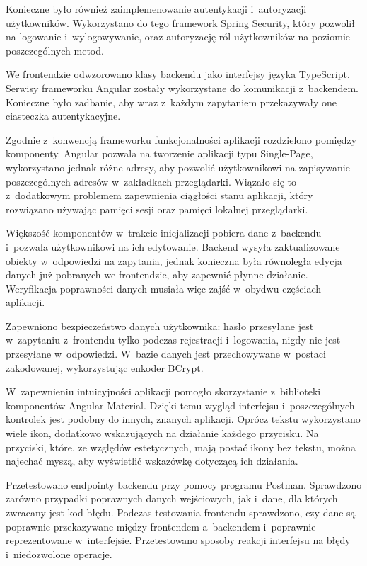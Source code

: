 \documentclass[a4paper,twoside,12pt]{book}
\begin{document}
Konieczne było również zaimplemenowanie autentykacji i~autoryzacji użytkowników. Wykorzystano do tego framework Spring Security, który pozwolił na logowanie i~wylogowywanie, oraz autoryzację ról użytkowników na poziomie poszczególnych metod.

We frontendzie odwzorowano klasy backendu jako interfejsy języka TypeScript. Serwisy frameworku Angular zostały wykorzystane do komunikacji z~backendem. Konieczne było zadbanie, aby wraz z~każdym zapytaniem przekazywały one ciasteczka autentykacyjne.

Zgodnie z~konwencją frameworku funkcjonalności aplikacji rozdzielono pomiędzy komponenty. Angular pozwala na tworzenie aplikacji typu Single-Page, wykorzystano jednak różne adresy, aby pozwolić użytkownikowi na zapisywanie poszczególnych adresów w~zakładkach przeglądarki. Wiązało się to z~dodatkowym problemem zapewnienia ciągłości stanu aplikacji, który rozwiązano używając pamięci sesji oraz pamięci lokalnej przeglądarki.

Większość komponentów w~trakcie inicjalizacji pobiera dane z~backendu i~pozwala użytkownikowi na ich edytowanie. Backend wysyła zaktualizowane obiekty w~odpowiedzi na zapytania, jednak konieczna była równoległa edycja danych już pobranych we frontendzie, aby zapewnić płynne działanie. Weryfikacja poprawności danych musiała więc zajść w~obydwu częściach aplikacji.

Zapewniono bezpieczeństwo danych użytkownika: hasło przesyłane jest w~zapytaniu z~frontendu tylko podczas rejestracji i~logowania, nigdy nie jest przesyłane w~odpowiedzi. W~bazie danych jest przechowywane w~postaci zakodowanej, wykorzystując enkoder BCrypt.

W~zapewnieniu intuicyjności aplikacji pomogło skorzystanie z~biblioteki komponentów Angular Material. Dzięki temu wygląd interfejsu i~poszczególnych kontrolek jest podobny do innych, znanych aplikacji. Oprócz tekstu wykorzystano wiele ikon, dodatkowo wskazujących na działanie każdego przycisku. Na przyciski, które, ze względów estetycznych, mają postać ikony bez tekstu, można najechać myszą, aby wyświetlić wskazówkę dotyczącą ich działania.

Przetestowano endpointy backendu przy pomocy programu Postman. Sprawdzono zarówno przypadki poprawnych danych wejściowych, jak i~dane, dla których zwracany jest kod błędu. Podczas testowania frontendu sprawdzono, czy dane są poprawnie przekazywane między frontendem a~backendem i~poprawnie reprezentowane w~interfejsie. Przetestowano sposoby reakcji interfejsu na błędy i~niedozwolone operacje. 
\end{document}
